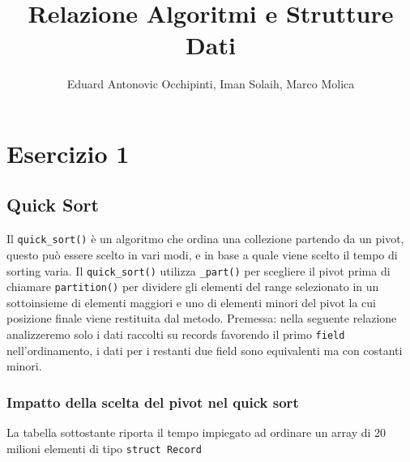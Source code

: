 \documentclass[12pt, letterpaper]{report}
\title{Relazione Algoritmi e Strutture Dati}
\author{Eduard Antonovic Occhipinti, Iman Solaih, Marco Molica}
\begin{document}
\maketitle
\tableofcontents

\chapter*{Esercizio 1}
\section{Quick Sort}
Il \verb|quick_sort()| è un algoritmo che ordina una collezione partendo da un pivot,
questo può essere scelto in vari modi, e in base a quale viene scelto il tempo
di sorting varia. Il \verb|quick_sort()| utilizza \verb|_part()| per scegliere il pivot prima 
di chiamare \verb|partition()| per dividere gli elementi del range selezionato 
in un sottoinsieme di elementi maggiori e uno di elementi minori del pivot
la cui posizione finale viene restituita dal metodo.
\newline
\newline
Premessa: nella seguente relazione analizzeremo solo i dati raccolti su records
favorendo il primo \verb|field| nell'ordinamento, i dati per i restanti due field
sono equivalenti ma con costanti minori.

\newpage
\subsection{Impatto della scelta del pivot nel quick sort}
La tabella sottostante riporta il tempo impiegato ad ordinare un array di 
20 milioni elementi di tipo \verb|struct Record|
\begin{figure}[H]
\centering
    
\end{figure}
\newpage
\end{document}
